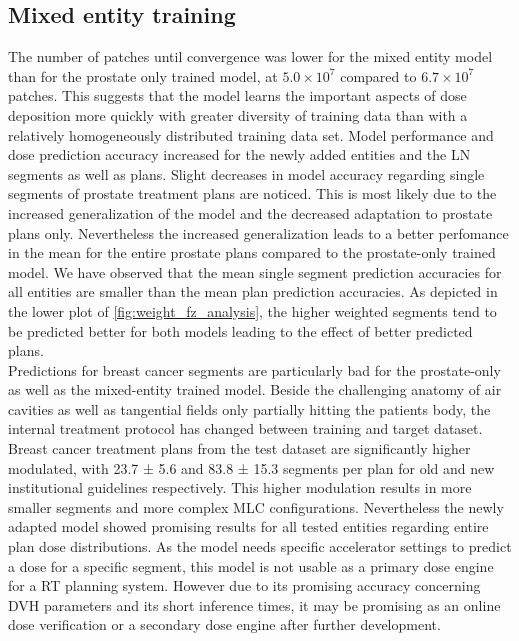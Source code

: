 \subsection{Mixed entity training}

The number of patches until convergence was lower for the mixed entity model than for the prostate only trained model, at $5.0 \times 10^7$ compared to $6.7 \times 10^7$ patches.
This suggests that the model learns the important aspects of dose deposition more quickly with greater diversity of training data than with a relatively homogeneously distributed training data set. 
Model performance and dose prediction accuracy increased for the newly added entities and the \acs{LN} segments as well as plans. 
Slight decreases in model accuracy regarding single segments of prostate treatment plans are noticed. 
This is most likely due to the increased generalization of the model and the decreased adaptation to prostate plans only.
Nevertheless the increased generalization leads to a better perfomance in the mean for the entire prostate plans compared to the prostate-only trained model.
We have observed that the mean single segment prediction accuracies for all entities are smaller than the mean plan prediction accuracies.
As depicted in the lower plot of \autoref{fig:weight_fz_analysis}, the higher weighted segments tend to be predicted better for both models leading to the effect of better predicted plans.\\
Predictions for breast cancer segments are particularly bad for the prostate-only as well as the mixed-entity trained model. 
Beside the challenging anatomy of air cavities as well as tangential fields only partially hitting the patients body, the internal treatment protocol has changed between training and target dataset. 
Breast cancer treatment plans from the test dataset are significantly higher modulated, with 23.7 ± 5.6 and 83.8 ± 15.3 segments per plan for old and new institutional guidelines respectively. 
This higher modulation results in more smaller segments and more complex \acs{MLC} configurations.
Nevertheless the newly adapted model showed promising results for all tested entities regarding entire plan dose distributions.
As the model needs specific accelerator settings to predict a dose for a specific segment, this model is not usable as a primary dose engine for a \acs{RT} planning system.
However due to its promising accuracy concerning DVH parameters and its short inference times, it may be promising as an online dose verification or a secondary dose engine after further development.

